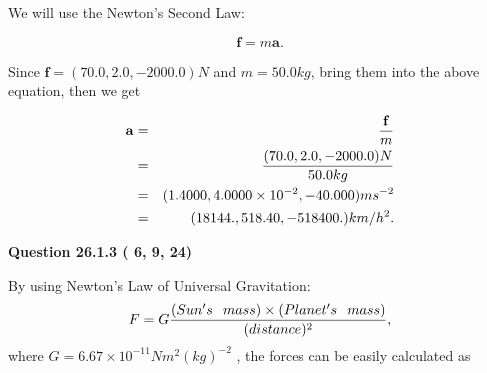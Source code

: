 \documentclass[12pt]{article}
\begin{document}
We will use the Newton's Second Law:
 
\[
\mathbf{f}=m\mathbf{a}.
\]
 
Since $\mathbf{f}=( %
70.0,  %
2.0,  %
-2000.0 )N$
and $m= %
50.0 kg$, bring them into the above equation, then we get
 
\begin{eqnarray*}
\mathbf{a}&=&\frac{\mathbf{f}}m  \\
&=&\frac{(
70.0 ,
2.0 ,
-2000.0 )N
}{ %
50.0 kg}  \\
&=&(
1.4000 ,
4.0000 \times 10^{-2},
-40.000
)ms^{-2} \\
&=&(
18144. ,
518.40 ,
-518400.
)km/h^2.
\end{eqnarray*}
 
 
 
  
\vspace{0.2in}
  
{\textbf{\Large{Question
26.1.3 
 (          6,          9,         24)
}}}
  
  
 
 
\noindent{}

By using Newton's Law of Universal Gravitation:
\[
F=G \frac{(Sun's \hspace{0.1in} mass) \times (Planet's \hspace{0.1in} mass)} { (distance)^2},
\]
where
$ G= %
6.67 \times 10^{-11}N m^{2}(kg)^{-2}$ , the forces can be easily calculated as
 
\vspace{0.2in}
 
\end{document}
